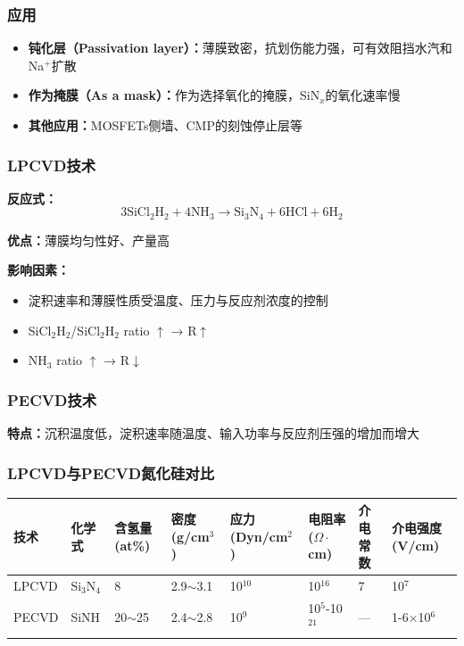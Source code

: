 \documentclass[UTF8,12pt,a4paper]{ctexart}
\begin{document}
\subsubsection{应用}

\begin{itemize}
    \item \textbf{钝化层（Passivation layer）：}薄膜致密，抗划伤能力强，可有效阻挡水汽和Na$^+$扩散
    \item \textbf{作为掩膜（As a mask）：}作为选择氧化的掩膜，SiN$_x$的氧化速率慢
    \item \textbf{其他应用：}MOSFETs侧墙、CMP的刻蚀停止层等
\end{itemize}

\subsubsection{LPCVD技术}

\textbf{反应式：}
\begin{equation}
3\text{SiCl}_2\text{H}_2 + 4\text{NH}_3 \rightarrow \text{Si}_3\text{N}_4 + 6\text{HCl} + 6\text{H}_2
\end{equation}

\textbf{优点：}薄膜均匀性好、产量高

\textbf{影响因素：}
\begin{itemize}
    \item 淀积速率和薄膜性质受温度、压力与反应剂浓度的控制
    \item SiCl$_2$H$_2$/SiCl$_2$H$_2$ ratio $\uparrow$ → R$\uparrow$
    \item NH$_3$ ratio $\uparrow$ → R$\downarrow$
\end{itemize}

\subsubsection{PECVD技术}

\textbf{特点：}沉积温度低，淀积速率随温度、输入功率与反应剂压强的增加而增大

\subsubsection{LPCVD与PECVD氮化硅对比}

\begin{longtable}{|M{2cm}|M{1.5cm}|M{1.8cm}|M{1.5cm}|M{2cm}|M{1.5cm}|M{1.5cm}|M{2cm}|}
\hline
\textbf{技术} & \textbf{化学式} & \textbf{含氢量(at\%)} & \textbf{密度(g/cm$^3$)} & \textbf{应力(Dyn/cm$^2$)} & \textbf{电阻率($\Omega\cdot$cm)} & \textbf{介电常数} & \textbf{介电强度(V/cm)} \\
\hline
LPCVD & Si$_3$N$_4$ & 8 & 2.9$\sim$3.1 & 10$^{10}$ & 10$^{16}$ & 7 & 10$^7$ \\
\hline
PECVD & SiNH & 20$\sim$25 & 2.4$\sim$2.8 & 10$^9$ & 10$^5$-10$^{21}$ & — & 1-6$\times$10$^6$ \\
\hline
\end{longtable}
\end{document}
